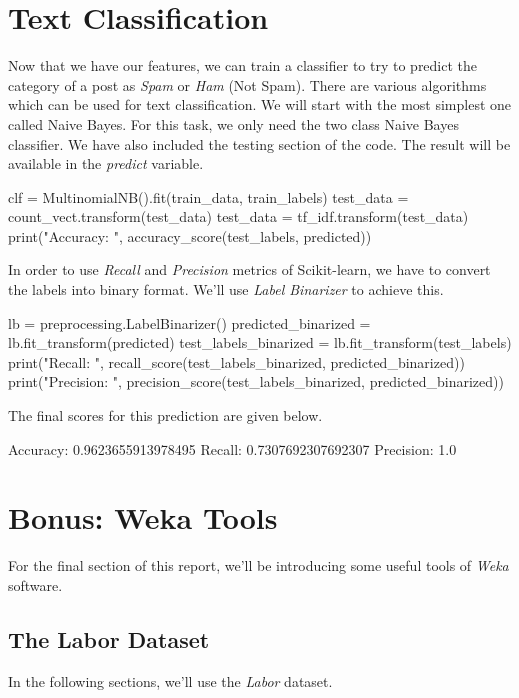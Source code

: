 \documentclass[12pt]{article}
\numberwithin{equation}{section}
\numberwithin{table}{section}
\numberwithin{figure}{section}
\begin{document}
\section{Text Classification}
Now that we have our features, we can train a classifier to try to predict the category of a post as \textit{Spam} or \textit{Ham} (Not Spam). There are various algorithms which can be used for text classification. We will start with the most simplest one called Naive Bayes. For this task, we only need the two class Naive Bayes classifier. We have also included the testing section of the code. The result will be available in the \textit{predict} variable.
\begin{python}
	clf = MultinomialNB().fit(train_data, train_labels)
	test_data = count_vect.transform(test_data)
	test_data = tf_idf.transform(test_data)
	print("Accuracy: ", accuracy_score(test_labels, predicted))
\end{python}
In order to use \textit{Recall} and \textit{Precision} metrics of Scikit-learn, we have to convert the labels into binary format. We'll use \textit{Label Binarizer} to achieve this.
\begin{python}
	lb = preprocessing.LabelBinarizer()
	predicted_binarized = lb.fit_transform(predicted)
	test_labels_binarized = lb.fit_transform(test_labels)
	print("Recall: ", recall_score(test_labels_binarized, predicted_binarized))
	print("Precision: ", precision_score(test_labels_binarized, predicted_binarized))
\end{python}
The final scores for this prediction are given below.
\begin{python}
	Accuracy:  0.9623655913978495
	Recall:  0.7307692307692307
	Precision:  1.0
\end{python}


\section{Bonus: Weka Tools}
For the final section of this report, we'll be introducing some useful tools of \textit{Weka} software. 

\subsection{The Labor Dataset}
In the following sections, we'll use the \textit{Labor} dataset.
\end{document}
